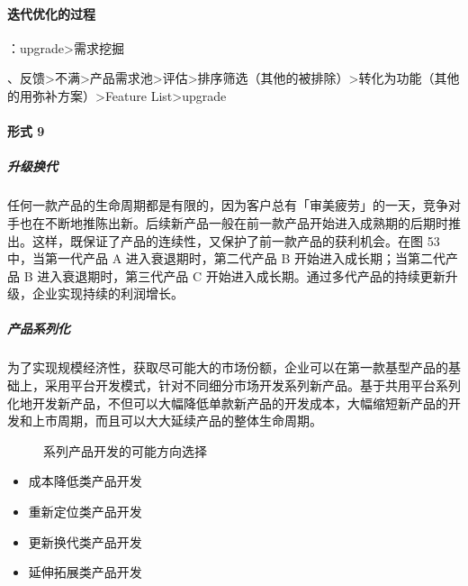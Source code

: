 \documentclass[letterpaper,11pt,english]{sphinxmanual}
\begin{document}
\paragraph{迭代优化的过程}
\label{\detokenize{chapter_knowledge/upgrade_manage:id4}}
：upgrade\sphinxhyphen{}>需求挖掘%
\begin{footnote}[580]\sphinxAtStartFootnote
{}
%
\end{footnote}、反馈\sphinxhyphen{}>不满\sphinxhyphen{}>产品需求池\sphinxhyphen{}>评估\sphinxhyphen{}>排序筛选（其他的被排除）\sphinxhyphen{}>转化为功能（其他的用弥补方案）\sphinxhyphen{}>Feature
List\sphinxhyphen{}>upgrade


\paragraph{形式 9\sphinxfootnotemark[581]}
\label{\detokenize{chapter_knowledge/upgrade_manage:id5}}%
\begin{footnotetext}[581]\sphinxAtStartFootnote
{}
%
\end{footnotetext}\ignorespaces 

\subparagraph{升级换代}
\label{\detokenize{chapter_knowledge/upgrade_manage:id6}}
任何一款产品的生命周期都是有限的，因为客户总有「审美疲劳」的一天，竞争对手也在不断地推陈出新。后续新产品一般在前一款产品开始进入成熟期的后期时推出。这样，既保证了产品的连续性，又保护了前一款产品的获利机会。在图
5\sphinxhyphen{}3 中，当第一代产品 A 进入衰退期时，第二代产品 B
开始进入成长期；当第二代产品 B 进入衰退期时，第三代产品 C
开始进入成长期。通过多代产品的持续更新升级，企业实现持续的利润增长。


\subparagraph{产品系列化}
\label{\detokenize{chapter_knowledge/upgrade_manage:id7}}
为了实现规模经济性，获取尽可能大的市场份额，企业可以在第一款基型产品的基础上，采用平台开发模式，针对不同细分市场开发系列新产品。基于共用平台系列化地开发新产品，不但可以大幅降低单款新产品的开发成本，大幅缩短新产品的开发和上市周期，而且可以大大延续产品的整体生命周期。

\begin{figure}[H]
\centering
\capstart

\noindent{}
\caption{系列产品开发的可能方向选择}\label{\detokenize{chapter_knowledge/upgrade_manage:id22}}\end{figure}
\begin{itemize}
\item {} 
成本降低类产品开发

\item {} 
重新定位类产品开发

\item {} 
更新换代类产品开发

\item {} 
延伸拓展类产品开发

\end{itemize}
\end{document}
